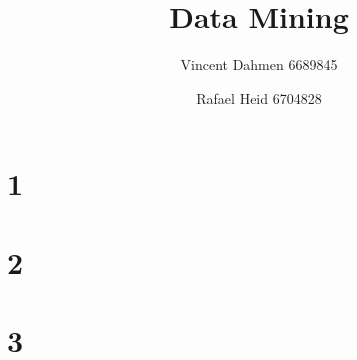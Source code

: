 \documentclass[12pt,a4paper]{article}
\title{Data Mining}
\author{Vincent Dahmen 6689845 \and Rafael Heid 6704828}
\begin{document}
\maketitle{}


\section*{1}

\section*{2}

\section*{3}

\end{document}
